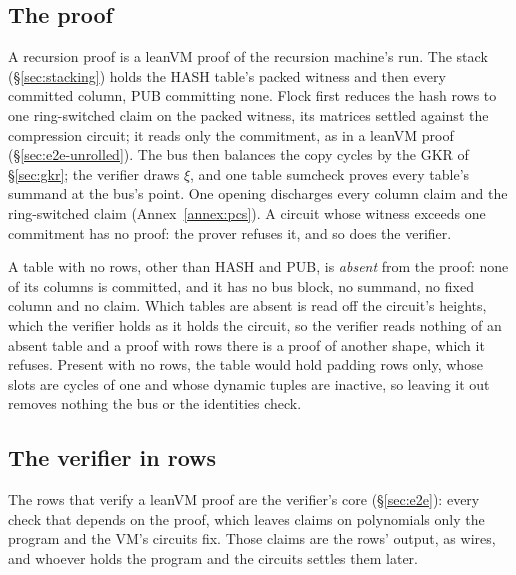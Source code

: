 \subsection{The proof}\label{rec:proof}

A recursion proof is a leanVM proof of the recursion machine's run. The stack (\S\ref{sec:stacking}) holds the \textsf{HASH} table's packed witness and then every committed column, \textsf{PUB} committing none. Flock first reduces the hash rows to one ring-switched claim on the packed witness, its matrices settled against the compression circuit; it reads only the commitment, as in a leanVM proof (\S\ref{sec:e2e-unrolled}). The bus then balances the copy cycles by the GKR of \S\ref{sec:gkr}; the verifier draws $\xi$, and one table sumcheck proves every table's summand at the bus's point. One opening discharges every column claim and the ring-switched claim (Annex~\ref{annex:pcs}). A circuit whose witness exceeds one commitment has no proof: the prover refuses it, and so does the verifier.

A table with no rows, other than \textsf{HASH} and \textsf{PUB}, is \emph{absent} from the proof: none of its columns is committed, and it has no bus block, no summand, no fixed column and no claim. Which tables are absent is read off the circuit's heights, which the verifier holds as it holds the circuit, so the verifier reads nothing of an absent table and a proof with rows there is a proof of another shape, which it refuses. Present with no rows, the table would hold padding rows only, whose slots are cycles of one and whose dynamic tuples are inactive, so leaving it out removes nothing the bus or the identities check.

\subsection{The verifier in rows}\label{rec:verifier}

The rows that verify a leanVM proof are the verifier's core (\S\ref{sec:e2e}): every check that depends on the proof, which leaves claims on polynomials only the program and the VM's circuits fix. Those claims are the rows' output, as wires, and whoever holds the program and the circuits settles them later.

